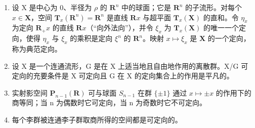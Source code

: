 \begin{enumerate}
\def\labelenumi{\alph{enumi})}
\setcounter{enumi}{1}
\item
  设 X 是中心为 0、半径为 \(\rho\) 的 \(\mathbf{R}^n\) 中的球面；它是 \(\mathbf{R}^n\) 的子流形。对每个 \(x \in \mathbf{X}\)，空间 \(\mathbf{T}_x(\mathbf{R}^n) = \mathbf{R}^n\) 是直线 \(\mathbf{R}x\) 与超平面 \(\mathbf{T}_x(\mathbf{X})\) 的直和。令 \(\eta_x\) 为定向 \(\mathbf{R}_+x\) 的直线 \(\mathbf{R}x\)（“向外法向”），并令 \(\xi_x\) 为 \(\mathbf{T}_x(\mathbf{X})\) 的唯一一个定向，使得 \(\eta_x\) 与 \(\xi_x\) 的乘积是定向 \(\xi^n\) 的 \(\mathbf{R}^n\)。映射 \(x \mapsto \xi_x\) 是 \(\mathbf{X}\) 的一个定向，称为典范定向。
\item
  设 X 是一个连通流形，G 是在 X 上适当地且自由地作用的离散群。X/G 可定向的充要条件是 X 可定向且 G 在 X 的定向集合上的作用是平凡的。
\item
  实射影空间 \(\mathbf{P}_{n-1}(\mathbf{R})\) 可与球面 \(S_{n-1}\) 在群 \(\{\pm1\}\) 通过 \(x\mapsto\pm x\) 的作用下的商等同；当 n 为偶数时它可定向，当 n 为奇数时它不可定向。
\item
  每个李群被连通李子群取商所得的空间都是可定向的。
\end{enumerate}

